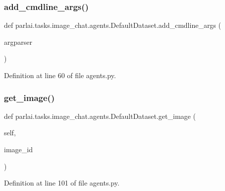 \subsubsection{\texorpdfstring{add\+\_\+cmdline\+\_\+args()}{add\_cmdline\_args()}}
{\footnotesize\ttfamily def parlai.\+tasks.\+image\+\_\+chat.\+agents.\+Default\+Dataset.\+add\+\_\+cmdline\+\_\+args (\begin{DoxyParamCaption}\item[{}]{argparser }\end{DoxyParamCaption})\hspace{0.3cm}{\ttfamily [static]}}



Definition at line 60 of file agents.\+py.

\mbox{\label{classparlai_1_1tasks_1_1image__chat_1_1agents_1_1DefaultDataset_ad06939ed5ac1393185d8e4eb1cf1706e}} 
\subsubsection{\texorpdfstring{get\+\_\+image()}{get\_image()}}
{\footnotesize\ttfamily def parlai.\+tasks.\+image\+\_\+chat.\+agents.\+Default\+Dataset.\+get\+\_\+image (\begin{DoxyParamCaption}\item[{}]{self,  }\item[{}]{image\+\_\+id }\end{DoxyParamCaption})}



Definition at line 101 of file agents.\+py.



